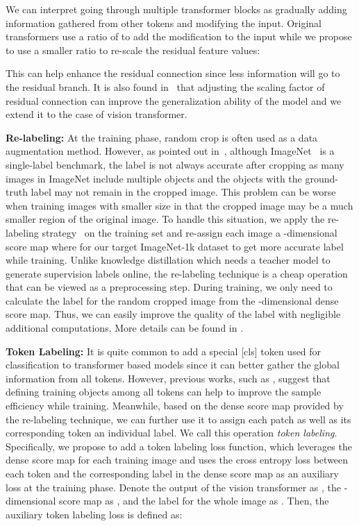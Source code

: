 \documentclass[10pt,twocolumn,letterpaper]{article}
\newcommand{\myPara}[1]{\vspace{.05in}\noindent\textbf{#1:}}
\begin{document}
We can interpret going through multiple transformer blocks as gradually adding information 
gathered from other tokens and modifying the input.
Original transformers use a ratio of  to add the modification to the input 
while we propose to use a smaller ratio  to re-scale the residual feature values:

This can help enhance the residual connection since less information will go to the residual branch. It is also found in~\cite{liu2020rethinking,liu2019self} that adjusting the scaling factor of residual connection can improve the generalization ability of the model and we extend it to the case of vision transformer. 

\myPara{Re-labeling}
At the training phase, random crop is often used as a data augmentation method. 
However, as pointed out in~\cite{yun2021relabel}, although ImageNet~\cite{deng2009imagenet} 
is a single-label benchmark, the label is not always accurate after cropping
as many images in ImageNet include multiple objects and the objects with the ground-truth label
may not remain in the cropped image.
This problem can be worse when training images with smaller size 
in that the cropped image may be a much smaller region of the original image.
To handle this situation, we apply the re-labeling strategy~\cite{yun2021relabel} 
on the training set and re-assign each image a -dimensional score map where 
for our target ImageNet-1k dataset to get more accurate label while training. 
Unlike knowledge distillation which needs a teacher model to generate supervision labels online, 
the re-labeling technique is a cheap operation that can be viewed as a preprocessing step. 
During training, we only need to calculate the label for the random cropped image 
from the -dimensional dense score map.
Thus, we can easily improve the quality of the label with negligible additional computations.
More details can be found in \cite{yun2021relabel}.

\myPara{Token Labeling}
It is quite common to add a special [cls] token used for classification to transformer based models
since it can better gather the global information from all tokens. 
However, previous works, such as \cite{clark2020electra}, suggest that defining training objects
among all tokens can help to improve the sample efficiency while training.
Meanwhile, based on the dense score map provided by the re-labeling technique, 
we can further use it to assign each patch as well as its corresponding token an individual label. 
We call this operation \emph{token labeling}.
Specifically, we propose to add a token labeling loss function, 
which leverages the dense score map for each training image and uses the cross entropy loss 
between each token and the corresponding label in the dense score map as an auxiliary loss
at the training phase.
Denote the output of the vision transformer as , 
the -dimensional score map as , and the label for the whole image as .
Then, the auxiliary token labeling loss is defined as:
\end{document}
